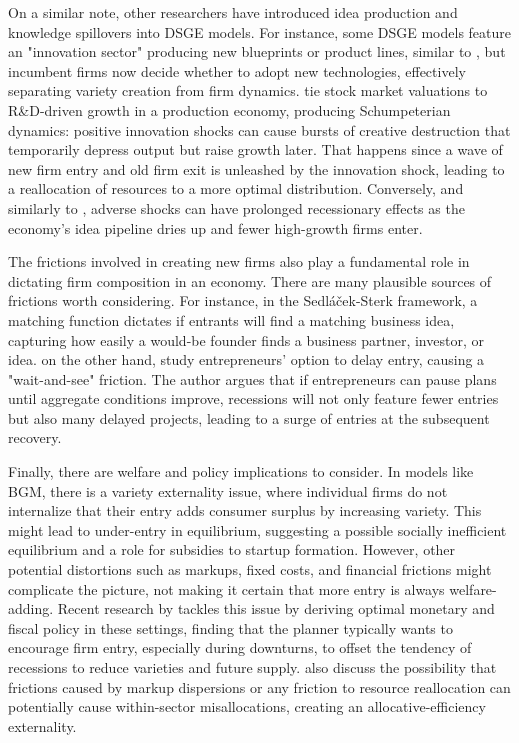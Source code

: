 \documentclass[a4paper,12pt]{article} %
\numberwithin{equation}{section} %
\numberwithin{figure}{section}
\numberwithin{table}{section}
\begin{document}
On a similar note, other researchers have introduced idea production and knowledge spillovers into DSGE models. For instance,
some DSGE models feature an "innovation sector" producing new blueprints or product lines, similar to \textcite{bilbiie2012endogenous},
but incumbent firms now decide whether to adopt new technologies, effectively separating variety creation from firm dynamics.
\textcite{kung2015innovation} tie stock market valuations to R\&D-driven growth in a production economy, producing Schumpeterian dynamics: 
positive innovation shocks can cause bursts of creative destruction that temporarily depress output but raise growth later. That happens 
since a wave of new firm entry and old firm exit is unleashed by the innovation shock, leading to a reallocation of resources to a more 
optimal distribution. Conversely, and similarly to \textcite{sedlavcek2017growth}, adverse shocks can have prolonged recessionary effects
as the economy's idea pipeline dries up and fewer high-growth firms enter.


The frictions involved in creating new firms also play a fundamental role in dictating firm composition in an economy. There are many plausible 
sources of frictions worth considering. For instance, in the Sedláček-Sterk framework, a matching function dictates if entrants will find a matching
business idea, capturing how easily a would-be founder finds a business partner, investor, or idea. \textcite{vardishvili2023entry} on the other hand,
study entrepreneurs' option to delay entry, causing a "wait-and-see" friction. The author argues that if entrepreneurs can pause plans until aggregate
conditions improve, recessions will not only feature fewer entries but also many delayed projects, leading to a surge of entries at the subsequent recovery.

Finally, there are welfare and policy implications to consider. In models like BGM, there is a variety externality issue, where individual firms do not internalize
that their entry adds consumer surplus by increasing variety. This might lead to under-entry in equilibrium, suggesting a possible socially inefficient equilibrium 
and a role for subsidies to startup formation. However, other potential distortions such as markups, fixed costs, and financial frictions might complicate the picture, 
not making it certain that more entry is always welfare-adding. Recent research by \textcite{bilbiie2019monopoly} tackles this issue by deriving optimal monetary
and fiscal policy in these settings, finding that the planner typically wants to encourage firm entry, especially during downturns, to offset the tendency of recessions
to reduce varieties and future supply. \textcite{baqaee2020productivity} also discuss the possibility that frictions caused by
markup dispersions or any friction to resource reallocation can potentially cause within-sector misallocations, creating an allocative-efficiency externality.
\end{document}

